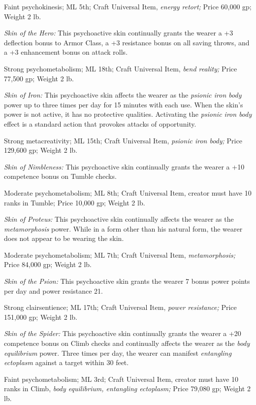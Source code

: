 \documentclass{article}
\begin{document}
Faint psychokinesis; ML 5th; Craft Universal Item, \textit{energy retort; }Price 
60,000 gp; Weight 2 lb.

\textit{Skin of the Hero: }This psychoactive skin continually grants the wearer 
a +3 deflection bonus to Armor Class, a +3 resistance bonus on all saving throws, 
and a +3 enhancement bonus on attack rolls.

Strong psychometabolism; ML 18th; Craft Universal Item, \textit{bend reality; }Price 
77,500 gp; Weight 2 lb.

\textit{Skin of Iron: }This psychoactive skin affects the wearer as the \textit{psionic 
iron body }power up to three times per day for 15 minutes with each use. When the 
skin's power is not active, it has no protective qualities. Activating the \textit{psionic 
iron body }effect is a standard action that provokes attacks of opportunity.

Strong metacreativity; ML 15th; Craft Universal Item, \textit{psionic iron body; 
}Price 129,600 gp; Weight 2 lb.

\textit{Skin of Nimbleness: }This psychoactive skin continually grants the wearer 
a +10 competence bonus on Tumble checks.

Moderate psychometabolism; ML 8th; Craft Universal Item, creator must have 10 ranks 
in Tumble; Price 10,000 gp; Weight 2 lb.

\textit{Skin of Proteus: }This psychoactive skin continually affects the wearer 
as the \textit{metamorphosis }power. While in a form other than his natural form, 
the wearer does not appear to be wearing the skin.

Moderate psychometabolism; ML 7th; Craft Universal Item, \textit{metamorphosis; 
}Price 84,000 gp; Weight 2 lb.

\textit{Skin of the Psion: }This psychoactive skin grants the wearer 7 bonus power 
points per day and power resistance 21. 

Strong clairsentience; ML 17th; Craft Universal Item, \textit{power resistance; 
}Price 151,000 gp; Weight 2 lb.

\textit{Skin of the Spider: }This psychoactive skin continually grants the wearer 
a +20 competence bonus on Climb checks and continually affects the wearer as the 
\textit{body equilibrium }power. Three times per day, the wearer can manifest \textit{entangling 
ectoplasm }against a target within 30 feet.

Faint psychometabolism; ML 3rd; Craft Universal Item, creator must have 10 ranks 
in Climb, \textit{body equilibrium, entangling ectoplasm; }Price 79,080 gp; Weight 
2 lb.
\end{document}
